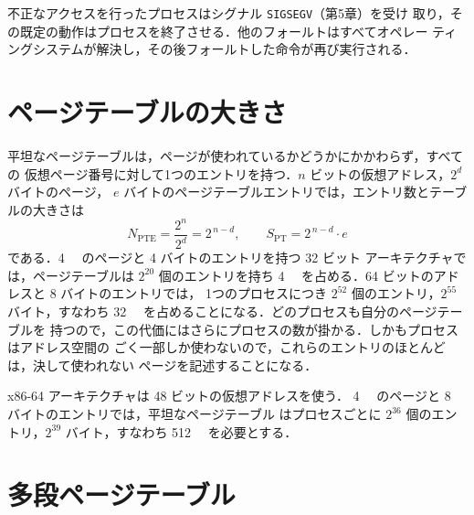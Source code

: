 \documentclass[../main.tex]{subfiles}
\begin{document}
不正なアクセスを行ったプロセスはシグナル \texttt{SIGSEGV}（第5章）を受け
取り，その既定の動作はプロセスを終了させる．他のフォールトはすべてオペレー
ティングシステムが解決し，その後フォールトした命令が再び実行される．

\section{ページテーブルの大きさ}
\label{sec:l08-pt-size}

平坦なページテーブルは，ページが使われているかどうかにかかわらず，すべての
仮想ページ番号に対して1つのエントリを持つ．$n$ ビットの仮想アドレス，$2^{d}$ バイトのページ，
$e$ バイトのページテーブルエントリでは，エントリ数とテーブルの大きさは
\begin{equation}
  N_{\mathrm{PTE}} = \frac{2^{n}}{2^{d}} = 2^{\,n-d} ,
  \qquad
  S_{\mathrm{PT}} = 2^{\,n-d} \cdot e
  \label{eq:l08-pt-size}
\end{equation}
である．\SI{4}{\kibi\byte} のページと 4 バイトのエントリを持つ 32 ビット
アーキテクチャでは，ページテーブルは $2^{20}$ 個のエントリを持ち
\SI{4}{\mebi\byte} を占める．64 ビットのアドレスと 8 バイトのエントリでは，
1つのプロセスにつき $2^{52}$ 個のエントリ，$2^{55}$ バイト，すなわち
\SI{32}{\pebi\byte} を占めることになる．どのプロセスも自分のページテーブルを
持つので，この代価にはさらにプロセスの数が掛かる．しかもプロセスはアドレス空間の
ごく一部しか使わないので，これらのエントリのほとんどは，決して使われない
ページを記述することになる．

\begin{example}
  x86-64 アーキテクチャは 48 ビットの仮想アドレスを使う．
  \SI{4}{\kibi\byte} のページと 8 バイトのエントリでは，平坦なページテーブル
  はプロセスごとに $2^{36}$ 個のエントリ，$2^{39}$ バイト，すなわち
  \SI{512}{\gibi\byte} を必要とする．
\end{example}

\section{多段ページテーブル}
\label{sec:l08-multilevel}
\end{document}
